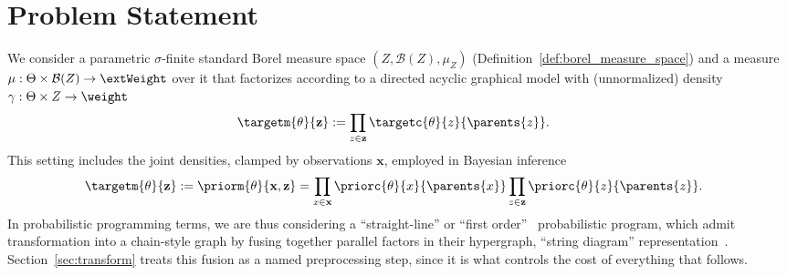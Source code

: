 %

\begin{abstract}
    This design document outlines a family of inference algorithm ingredients for fast, potentially soft, maximum-a-posteriori estimation in joint distributions of (potentially loopy) Bayesian networks and (potentially) factor graphs. The aim is to support finite, countably infinite, and continuous random variables. We first ask when min-sum message passing may be used in loopy graphs, and show that it is exact up to cyclomatic number one, exhibit explicit counterexamples beyond it, and argue that the operative condition is tightness of a linear-programming relaxation rather than acyclicity. We then organise the available algorithmic ingredients into four algorithms over a common substrate, scored on cost, guarantee, assumptions, and biological plausibility.
\end{abstract}

\section{Problem Statement}

We consider a parametric $\sigma$-finite standard Borel measure space $(Z,\mathcal{B}(Z), \mu_{Z})$ (Definition~\ref{def:borel_measure_space}) and a measure $\mu: \Theta \times \mathcal{B}(Z) \rightarrow \extWeight$ over it that factorizes according to a directed acyclic graphical model with (unnormalized) density $\gamma: \Theta \times Z \rightarrow \weight$
\begin{align}
    \label{eq:factorization}
    \targetm{\theta}{\mathbf{z}} &:= \prod_{z \in \mathbf{z}} \targetc{\theta}{z}{\parents{z}}.
\end{align}
This setting includes the joint densities, clamped by observations $\mathbf{x}$, employed in Bayesian inference
\begin{align}
    \targetm{\theta}{\mathbf{z}} &:= \priorm{\theta}{\mathbf{x}, \mathbf{z}} = \prod_{x \in \mathbf{x}} \priorc{\theta}{x}{\parents{x}} \prod_{z \in \mathbf{z}} \priorc{\theta}{z}{\parents{z}}.
\end{align}
In probabilistic programming terms, we are thus considering a ``straight-line'' or ``first order''~\citep{vandeMeent2021} probabilistic program, which admit transformation into a chain-style graph by fusing together parallel factors in their hypergraph, ``string diagram'' representation~\citep{Sennesh2023}. Section~\ref{sec:transform} treats this fusion as a named preprocessing step, since it is what controls the cost of everything that follows.

